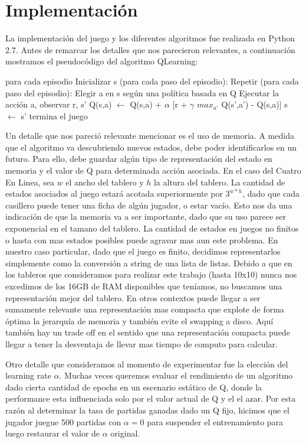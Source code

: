 \documentclass[10pt,a4paper]{article}
\begin{document}
\section{Implementación}

La implementación del juego y los diferentes algoritmos fue realizada en Python 2.7. Antes de remarcar los detalles que nos parecieron relevantes, a continuación mostramos el pseudocódigo del algoritmo QLearning:

\begin{algorithmic}
\Repeat \: para cada episodio
	\State Inicializar s
	\Repeat (para cada paso del episodio):
		\State Repetir (para cada paso del episodio):
		\State Elegir a en s según una política basada en Q
		\State Ejecutar la acción a, observar r, s'
		\State Q(s,a) $\leftarrow$ Q(s,a) + $\alpha$ [r + $\gamma$ $max_{a'}$ Q(s',a') - Q(s,a)]
		\State s $\leftarrow$ s'
\Until termina el juego
\end{algorithmic}

Un detalle que nos pareció relevante mencionar es el uso de memoria. A medida que el algoritmo va descubriendo nuevos estados, debe poder identificarlos en un futuro. Para ello, debe guardar algún tipo de representación del estado en memoria y el valor de Q para determinada acción asociada. En el caso del Cuatro En Linea, sea $w$ el ancho del tablero y $h$ la altura del tablero. La cantidad de estados asociados al juego estará acotada superiormente por $3^{w*h}$, dado que cada casillero puede tener una ficha de algún jugador, o estar vacío. Esto nos da una indicación de que la memoria va a ser importante, dado que su uso parece ser exponencial en el tamano del tablero. La cantidad de estados en juegos no finitos o hasta con mas estados posibles puede agravar mas aun este problema. En nuestro caso particular, dado que el juego es finito, decidimos representarlos simplemente como la conversión a string de una lista de listas. Debido a que en los tableros que consideramos para realizar este trabajo (hasta 10x10) nunca nos excedimos de los 16GB de RAM disponibles que teníamos, no buscamos una representación mejor del tablero. En otros contextos puede llegar a ser sumamente relevante una representación mas compacta que explote de forma óptima la jerarquía de memoria y también evite el swapping a disco. Aquí también hay un trade off en el sentido que una representación compacta puede llegar a tener la desventaja de llevar mas tiempo de computo para calcular.

Otro detalle que consideramos al momento de experimentar fue la elección del learning rate $\alpha$. Muchas veces queremos evaluar el rendimiento de un algoritmo dado cierta cantidad de epochs en un escenario estático de Q, donde la performance esta influenciada solo por el valor actual de Q y el el azar. Por esta razón al determinar la tasa de partidas ganadas dado un Q fijo, hicimos que el jugador juegue 500 partidas con $\alpha = 0$ para suspender el entrenamiento para luego restaurar el valor de $\alpha$ original.
\end{document}
